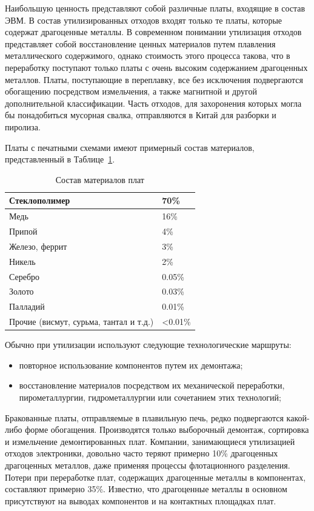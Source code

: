 Наибольшую ценность представляют собой различные платы, входящие в состав ЭВМ. В состав утилизированных отходов входят только те платы, которые содержат драгоценные металлы. В современном понимании утилизация отходов представляет собой восстановление ценных материалов путем плавления металлического содержимого, однако стоимость этого процесса такова, что в переработку поступают только платы с очень высоким содержанием драгоценных металлов. Платы, поступающие в переплавку, все без исключения подвергаются обогащению посредством измельчения, а также магнитной и другой дополнительной классификации. Часть отходов, для захоронения которых могла бы понадобиться мусорная свалка, отправляются в Китай для разборки и пиролиза.

Платы с печатными схемами имеют примерный состав материалов, представленный в Таблице~\ref{table:sos_plat}.

\begin{table}
\caption{Состав материалов плат}
\label{table:sos_plat}
\begin{tabular}{| l | l |}
\hline
Стеклополимер & 70\%\\
\hline
Медь & 16\%\\
\hline
Припой & 4\%\\
\hline
Железо, феррит & 3\%\\
\hline
Никель & 2\%\\
\hline
Серебро & 0.05\%\\
\hline
Золото & 0.03\%\\
\hline
Палладий & 0.01\%\\
\hline
Прочие (висмут, сурьма, тантал и т.д.) & <0.01\%\\
\hline
\end{tabular}
\end{table}

Обычно при утилизации используют следующие технологические маршруты:
\begin{itemize}
\item повторное использование компонентов путем их демонтажа;
\item восстановление материалов посредством их механической переработки, пирометаллургии, гидрометаллургии или сочетанием этих технологий;
\end{itemize}

Бракованные платы, отправляемые в плавильную печь, редко подвергаются какой-либо форме обогащения. Производятся только выборочный демонтаж, сортировка и измельчение демонтированных плат. Компании, занимающиеся утилизацией отходов электроники, довольно часто теряют примерно 10\% драгоценных драгоценных металлов, даже применяя процессы флотационного разделения. Потери при переработке плат, содержащих драгоценные металлы в компонентах, составляют примерно 35\%. Известно, что драгоценные металлы в основном присутствуют на выводах компонентов и на контактных площадках плат.

